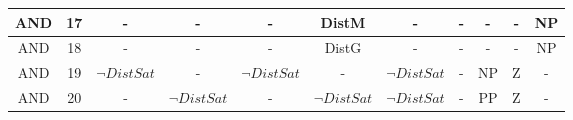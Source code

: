 \begin{table}[ht]
{\begin{tabular}{|c|c|c|c|c|c|c|c|c|c|c|}
AND                                                                             & 17                & -              & -              & -              & DistM          & -              & -      & -      & -          & NP         \\ \hline
AND                                                                             & 18                & -              & -              & -              & DistG          & -              & -      & -      & -          & NP         \\ \hline
AND                                                                             & 19                & $\neg DistSat$ & -              & $\neg DistSat$ & -              & $\neg DistSat$ & -      & NP     & Z          & -          \\ \hline
AND                                                                             & 20                & -              & $\neg DistSat$ & -              & $\neg DistSat$ & $\neg DistSat$ & -      & PP     & Z          & -          \\ \hline
\end{tabular}
}
\label{tab:regrasSeguirParede}
\end{table}